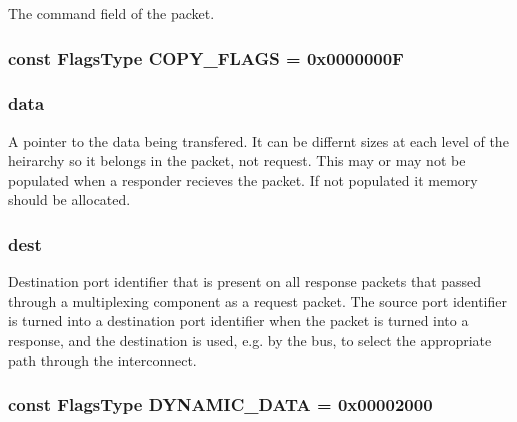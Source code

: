 The command field of the packet. \hypertarget{classPacket_af494771dbda61056aaad3f6ad7e2d84d}{
\subsubsection[{COPY\_\-FLAGS}]{\setlength{\rightskip}{0pt plus 5cm}const {\bf FlagsType} {\bf COPY\_\-FLAGS} = 0x0000000F}}
\label{classPacket_af494771dbda61056aaad3f6ad7e2d84d}
\hypertarget{classPacket_a60f451ea06dccaf49b32633f67e7b16e}{
\subsubsection[{data}]{ {\bf data}}}
\label{classPacket_a60f451ea06dccaf49b32633f67e7b16e}
A pointer to the data being transfered. It can be differnt sizes at each level of the heirarchy so it belongs in the packet, not request. This may or may not be populated when a responder recieves the packet. If not populated it memory should be allocated. \hypertarget{classPacket_a826324ce6e458b38e4010b9e0ca8f14a}{
\subsubsection[{dest}]{ {\bf dest}}}
\label{classPacket_a826324ce6e458b38e4010b9e0ca8f14a}
Destination port identifier that is present on all response packets that passed through a multiplexing component as a request packet. The source port identifier is turned into a destination port identifier when the packet is turned into a response, and the destination is used, e.g. by the bus, to select the appropriate path through the interconnect. \hypertarget{classPacket_a0100d751aaef8a927f7ba551550d142b}{
\subsubsection[{DYNAMIC\_\-DATA}]{\setlength{\rightskip}{0pt plus 5cm}const {\bf FlagsType} {\bf DYNAMIC\_\-DATA} = 0x00002000}}
